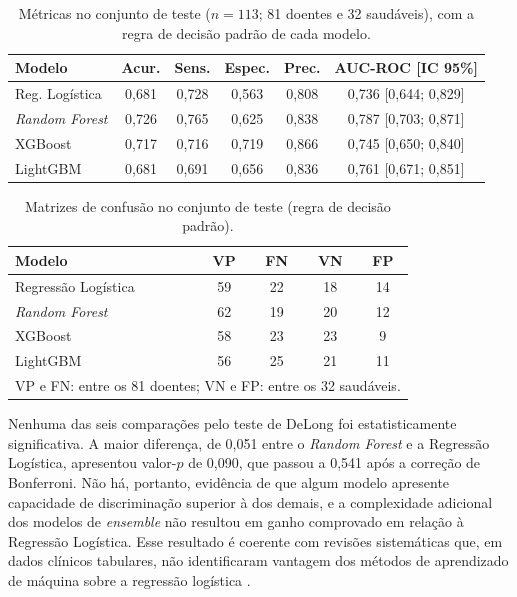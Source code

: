 \begin{table}[htbp]
\centering
\begin{tabular}{lccccc}
\hline
\textbf{Modelo} & \textbf{Acur.} & \textbf{Sens.} & \textbf{Espec.} & \textbf{Prec.} & \textbf{AUC-ROC [IC 95\%]} \\
\hline
Reg. Logística         & 0,681 & 0,728 & 0,563 & 0,808 & 0,736 [0,644; 0,829] \\
\textit{Random Forest} & 0,726 & 0,765 & 0,625 & 0,838 & 0,787 [0,703; 0,871] \\
XGBoost                & 0,717 & 0,716 & 0,719 & 0,866 & 0,745 [0,650; 0,840] \\
LightGBM               & 0,681 & 0,691 & 0,656 & 0,836 & 0,761 [0,671; 0,851] \\
\hline
\end{tabular}
\caption{Métricas no conjunto de teste ($n = 113$; 81 doentes e 32 saudáveis), com a regra de decisão padrão de cada modelo.}
\label{tab:res_teste}
\par\vspace{2pt}{\footnotesize IC: intervalo de confiança pelo método de DeLong. Classificador trivial (todos doentes): acurácia 0,717 e especificidade 0.}
\end{table}

\begin{table}[htbp]
\centering
\begin{tabular}{lcccc}
\hline
\textbf{Modelo} & \textbf{VP} & \textbf{FN} & \textbf{VN} & \textbf{FP} \\
\hline
Regressão Logística    & 59 & 22 & 18 & 14 \\
\textit{Random Forest} & 62 & 19 & 20 & 12 \\
XGBoost                & 58 & 23 & 23 & 9 \\
LightGBM               & 56 & 25 & 21 & 11 \\
\hline
\multicolumn{5}{l}{\footnotesize VP e FN: entre os 81 doentes; VN e FP: entre os 32 saudáveis.} \\
\end{tabular}
\caption{Matrizes de confusão no conjunto de teste (regra de decisão padrão).}
\label{tab:res_confusao}
\end{table}

Nenhuma das seis comparações pelo teste de DeLong foi estatisticamente significativa. A maior diferença, de 0,051 entre o \textit{Random Forest} e a Regressão Logística, apresentou valor-$p$ de 0,090, que passou a 0,541 após a correção de Bonferroni. Não há, portanto, evidência de que algum modelo apresente capacidade de discriminação superior à dos demais, e a complexidade adicional dos modelos de \textit{ensemble} não resultou em ganho comprovado em relação à Regressão Logística. Esse resultado é coerente com revisões sistemáticas que, em dados clínicos tabulares, não identificaram vantagem dos métodos de aprendizado de máquina sobre a regressão logística \cite{Christodoulou2019Systematic, Nusinovici2020Logistic}.

